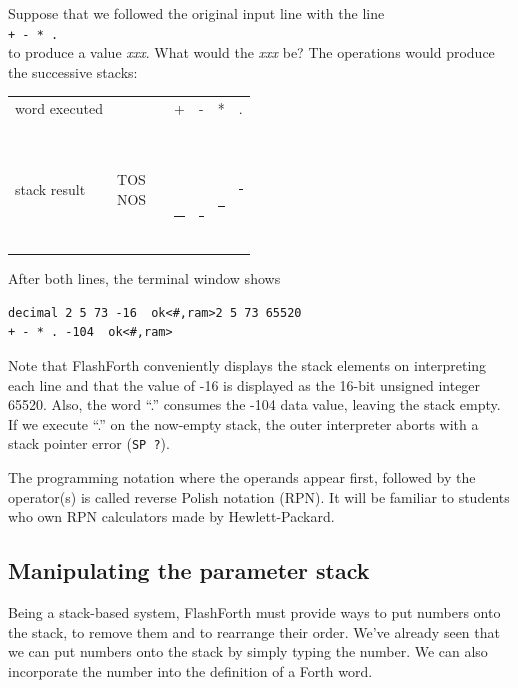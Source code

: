 \documentclass[12pt,a4paper]{article}
\begin{document}
\medskip
Suppose that we followed the original input line with the line \vspace{7pt} \\
\verb!+ - * . ! \fbox{$\hookleftarrow$} \vspace{7pt} \\
to produce a value  \textit{xxx}.
What would the \textit{xxx} be?
The operations would produce the successive stacks:
\begin{center}
 \begin{tabular}{lc|ccccc}
 word executed & & & + & - & * & . \\
 \\
 stack result  
 & \parbox[t]{35pt}{TOS \\ NOS} 
 & \parbox[t]{30pt}{ \\  \\  \\  \\ \rule{30pt}{2pt}} 
 & \parbox[t]{30pt}{ \  \\  \\ \rule{30pt}{2pt}}
 & \parbox[t]{30pt}{ \\  \\ \rule{30pt}{2pt}}
 & \parbox[t]{30pt}{ \\ \rule{30pt}{2pt}}
 & \parbox[t]{30pt}{\rule{30pt}{2pt}} \\
 \end{tabular}
\end{center}
After both lines, the terminal window shows
\begin{verbatim}
decimal 2 5 73 -16  ok<#,ram>2 5 73 65520 
+ - * . -104  ok<#,ram>
\end{verbatim}
Note that FlashForth conveniently displays the stack elements on interpreting each line 
and that the value of -16 is displayed as the 16-bit unsigned integer 65520.
Also, the word ``.'' consumes the -104 data value, leaving the stack empty.
If we execute ``.'' on the now-empty stack, the outer interpreter aborts with
a stack pointer error (\verb!SP ?!).

\medskip
The programming notation where the operands appear first,
followed by the operator(s) is called reverse Polish notation (RPN).
It will be familiar to students who own RPN calculators made by Hewlett-Packard.


\medskip
\subsection{Manipulating the parameter stack}
\label{sec:parameter-stack}
%
Being a stack-based system, FlashForth must provide ways to put numbers onto the stack,
to remove them and to rearrange their order.
We've already seen that we can put numbers onto the stack by simply typing the number.
We can also incorporate the number into the definition of a Forth word.
\end{document}
